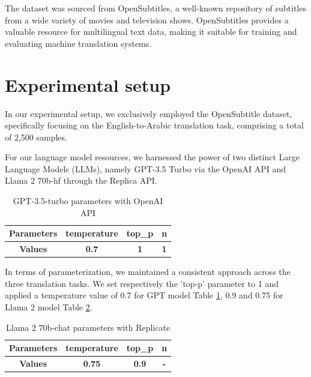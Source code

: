 \documentclass[twocolumn]{article}
\begin{document}
The dataset was sourced from OpenSubtitles\cite{lison2016opensubtitles2016}, a well-known repository of subtitles
from a wide variety of movies and television shows. OpenSubtitles provides a valuable
resource for multilingual text data, making it suitable for training and evaluating
machine translation systems.


\section{Experimental setup}
In our experimental setup, we exclusively employed the OpenSubtitle dataset, specifically focusing on the English-to-Arabic translation task, comprising a total of 2,500 samples.

For our language model resources, we harnessed the power of two distinct Large Language Models (LLMs), namely GPT-3.5 Turbo via the OpenAI API and Llama 2 70b-hf through the Replica API.


\begin{table}[h]
\centering
\begin{tabular}{|c|c|c|c|}
	\hline
	\textbf{Parameters}  & \textbf{temperature} & \textbf{top\_p} & \textbf{n}\\
	\hline
	\textbf{Values}  & \textbf{0.7}  & \textbf{1}  & \textbf{1}\\
	\hline
\end{tabular}
\caption{GPT-3.5-turbo parameters with OpenAI API}
\label{table:GPT_3.5_turbo_parameters_with_OpenAI_API}
\end{table}

In terms of parameterization, we maintained a consistent approach across the three translation tasks. We set respectively the 'top-p' parameter to 1  and applied a temperature value of 0.7 for GPT model Table \ref{table:GPT_3.5_turbo_parameters_with_OpenAI_API},  0.9 and 0.75 for Llama 2 model Table \ref{table:Llama_2_70b_chat_parameters}. 


\begin{table}[h]
\centering
\begin{tabular}{|c|c|c|c|}
	
	\hline
	\textbf{Parameters} & \textbf{temperature} & \textbf{top\_p} & \textbf{n}\\
	\hline
	\textbf{Values}  & \textbf{0.75}  & \textbf{0.9}  & \textbf{-}\\
	\hline
\end{tabular}
\caption{Llama 2 70b-chat parameters with Replicate}
\label{table:Llama_2_70b_chat_parameters}
\end{table}
\end{document}
